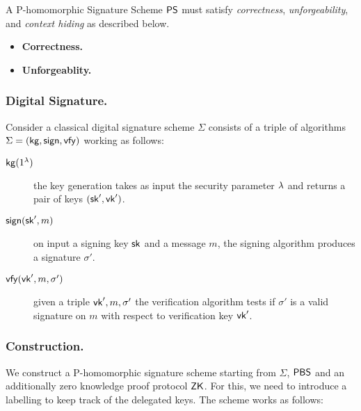 \documentclass[11pt]{llncs}
\begin{document}
A P-homomorphic Signature Scheme ${\sf PS}$ must satisfy {\em correctness}, {\em unforgeability},  and {\em context hiding}
as described below. 
\begin{itemize}

\item \textbf{Correctness.} 
%



\item \textbf{Unforgeablity.} 
\end{itemize}

\subsubsection{Digital Signature.}
Consider a classical digital signature scheme $\Sigma$ consists of a triple of algorithms  $\Sigma=({\sf kg},{\sf sign},{\sf vfy})$ working as follows:
\begin{description}
  \item[${\sf kg}(1^{\lambda})$] the key generation takes as input the security parameter $\lambda$ and returns a pair of keys $({\sf sk}',{\sf vk}')$.
  \item[${\sf sign}({\sf sk}', m)$] on input a signing key ${\sf sk}$ and a message $m$, the signing algorithm produces 
  a signature $\sigma'$.
  \item[${\sf vfy}({\sf vk}', m, \sigma')$]  given a triple ${\sf vk}',m,\sigma'$ the verification algorithm tests if $\sigma'$ is a valid signature on $m$ with respect to verification key ${\sf vk}'$.
\end{description} 


\subsubsection{Construction.}
We construct a P-homomorphic signature scheme starting from $\Sigma$, ${\sf PBS}$ and an additionally zero knowledge proof protocol ${\sf ZK}$. For this, we need to introduce a labelling to keep track of the delegated keys. The scheme works as follows:\\
\end{document}
